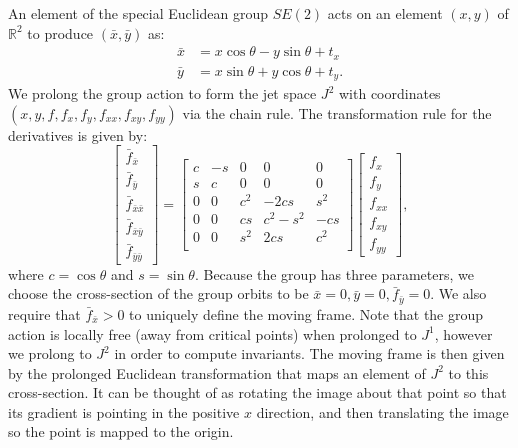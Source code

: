 \documentclass{artjlt}
\begin{document}
An element of the special Euclidean group $SE(2)$ acts on an element $(x, y)$ of $\mathbb{R}^2$ to produce $(\bar{x}, \bar{y})$ as:
\begin{equation*}
  \begin{aligned}
    \bar{x} &= x\cos\theta  - y\sin\theta + t_x \\
    \bar{y} &= x\sin\theta  + y\cos\theta + t_y.
  \end{aligned}
\end{equation*}
We prolong the group action to form the jet space $J^2$ with coordinates $(x,
y, f, f_x, f_y, f_{xx}, f_{xy}, f_{yy})$ via the chain rule. The
transformation rule for the derivatives is given by:
\begin{equation}
  \begin{bmatrix}
  \bar f_{\bar x} \\ \bar f_{\bar y} \\ \bar f_{\bar{x}\bar{x}} \\ \bar f_{\bar{x}\bar{y}} \\ \bar f_{\bar{y}\bar{y}}
  \end{bmatrix} = 
  \begin{bmatrix}
 c & -s & 0 & 0 & 0 \\
 s & c & 0 & 0 & 0 \\
0 & 0 & c^2 & -2cs & s^2 \\
0 & 0 & cs & c^2 - s^2 & -cs \\
0 & 0 & s^2 & 2cs & c^2 \\
  \end{bmatrix}
  \begin{bmatrix}
f_x \\ f_y \\ f_{xx} \\ f_{xy} \\ f_{yy} 
  \end{bmatrix},
\label{eqn:SE2}
 \end{equation}
where $c = \cos \theta$ and $s = \sin \theta$. Because the group has three
parameters, we choose the cross-section of the group orbits to be $\bar{x}
= 0, \bar{y} = 0, \bar{f}_{\bar{y}} = 0$. We also require that $\bar{f}_{\bar{x}}
> 0$ to uniquely define the moving frame. Note that the group action is
locally free (away from critical points) when prolonged to $J^1$, however
we prolong to $J^2$ in order to compute invariants. The moving
frame is then given by the prolonged Euclidean transformation that maps an
element of  $J^2$ to this cross-section. It can be thought of as rotating
the image about that point so that its gradient is pointing in the positive
$x$ direction, and then translating the image so the point is mapped to the
origin. 
\end{document}
